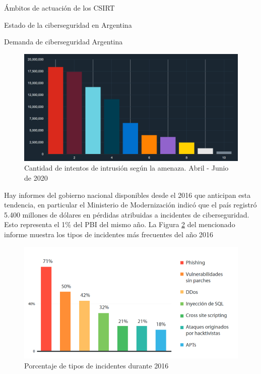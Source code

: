 \begin{section}{Ámbitos de actuación de los CSIRT}
\begin{subsection}{Estado de la ciberseguridad en Argentina}
\begin{subsubsection}{Demanda de ciberseguridad Argentina}
            \begin{figure}[H]
            \centering
            \includegraphics[width=1\textwidth]{./marco_teorico_imagenes/figura_6_cant_intentos_intrusion.png}
            \caption{ Cantidad de intentos de intrusión según la amenaza. Abril - Junio de 2020}
            \label{fig:cant_intentos}
        \end{figure}
        \FloatBarrier
        Hay informes del gobierno nacional \cite{panorama} disponibles desde el 2016 que anticipan esta tendencia, en particular el Ministerio de Modernización indicó que el país registró 5.400 millones de dólares en pérdidas atribuidas a incidentes de ciberseguridad. Esto representa el 1\% del PBI \cite{pbi} del mismo año. La Figura \ref{fig:porcentaje_tipos} del mencionado informe muestra los tipos de incidentes más frecuentes del año 2016 \par
        \begin{figure}[H]
            \centering
            \includegraphics[width=1\textwidth]{./marco_teorico_imagenes/figura_7_tipos_de_incidentes.png}
            \caption{Porcentaje de tipos de incidentes durante 2016}
            \label{fig:porcentaje_tipos}
        \end{figure}

\end{subsubsection}
\end{subsection}
\end{section}
